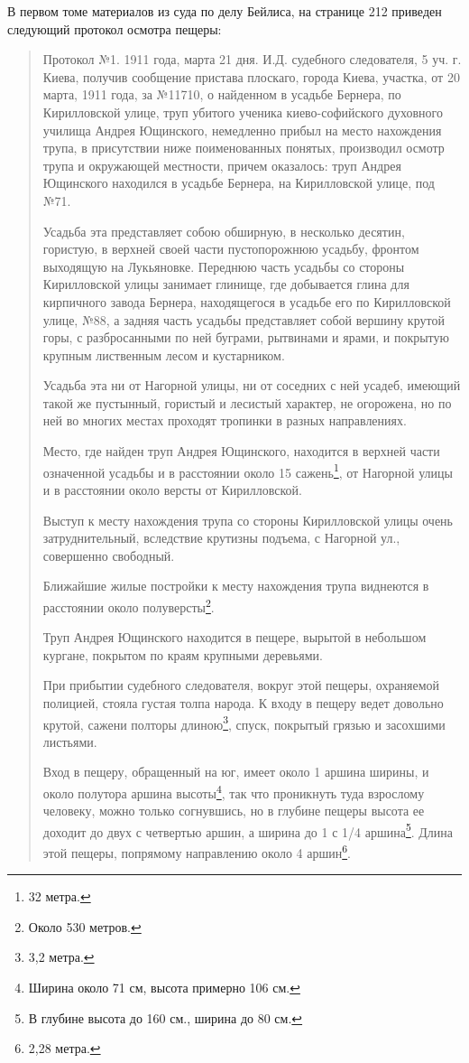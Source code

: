 В первом томе материалов из суда по делу Бейлиса, на странице 212 приведен следующий протокол осмотра пещеры:

\begin{quotation} 
Протокол №1. 1911 года, марта 21 дня. И.Д. судебного следователя, 5 уч. г. Киева, получив сообщение пристава плоскаго, города Киева, участка, от 20 марта, 1911 года, за №11710, о найденном в усадьбе Бернера, по Кирилловской улице, труп убитого ученика киево-софи\-йского духовного училища Андрея Ющинского, немедленно прибыл на место нахождения трупа, в присутствии ниже поименованных понятых, производил осмотр трупа и окружающей местности, причем оказалось: труп Андрея Ющинского  находился в усадьбе Бернера, на Кирилловской улице, под №71. 

Усадьба эта представляет собою обширную, в неск\-олько десятин, гористую, в верхней своей части пустопорожнюю усадьбу, фронтом выходящую на Лукьяновке. Переднюю часть усадьбы со стороны Кирилловской улицы занимает глинище, где добывается глина для кирпичного завода Бернера, находящегося в усадьбе его по Кирилловской улице, №88, а задняя часть усадьбы представляет собой вершину крутой горы, с разбросанными по ней буграми, рытвинами и ярами, и покрытую крупным лиственным лесом и кустарником.

Усадьба эта ни от Нагорной улицы, ни от соседних с ней усадеб, имеющий такой же пустынный, гористый и лесистый характер, не огорожена, но по ней во многих местах проходят тропинки в разных направлениях.

Место, где найден труп Андрея Ющинского, находится в верхней части означенной усадьбы и в расстоянии около 15 сажень\footnote{32 метра.}, от Нагорной улицы и в расстоянии около версты от Кирилловской.

Выступ к месту нахождения трупа со стороны Кирилловской улицы очень затруднительный, вследствие крутизны подъема, с Нагорной ул., совершенно свободный.

Ближайшие жилые постройки к месту нахождения трупа виднеются в расстоянии около полуверсты\footnote{Около 530 метров.}.

Труп Андрея Ющинского находится в пещере, вырытой в небольшом кургане, покрытом по краям крупными деревьями. 

При прибытии судебного следователя, вокруг этой пещеры, охраняемой полицией, стояла густая толпа народа. К входу в пещеру ведет довольно крутой, сажени полторы длиною\footnote{3,2 метра.}, спуск, покрытый грязью и засохшими листьями.

Вход в пещеру, обращенный на юг, имеет около 1 аршина ширины, и около полутора аршина высоты\footnote{Ширина около 71 см, высота примерно 106 см.}, так что проникнуть туда взрослому человеку, можно только согнувшись, но в глубине пещеры высота ее доходит до двух с четвертью аршин, а ширина до 1 с 1/4 аршина\footnote{В глубине высота до 160 см., ширина до 80 см.}. Длина этой пещеры, попрямому направлению около 4 аршин\footnote{2,28 метра.}.


\end{quotation}
